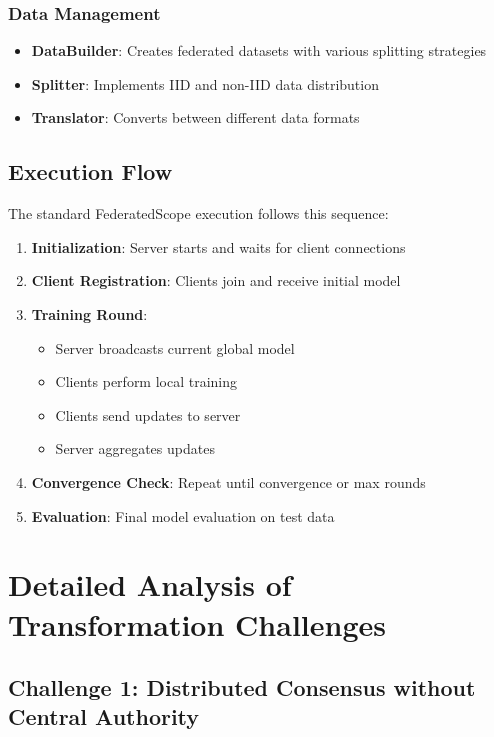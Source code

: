 \documentclass[11pt,conference]{article}
\begin{document}
\subsubsection{Data Management}
\begin{itemize}
    \item \textbf{DataBuilder}: Creates federated datasets with various splitting strategies
    \item \textbf{Splitter}: Implements IID and non-IID data distribution
    \item \textbf{Translator}: Converts between different data formats
\end{itemize}

\subsection{Execution Flow}

The standard FederatedScope execution follows this sequence:

\begin{enumerate}
    \item \textbf{Initialization}: Server starts and waits for client connections
    \item \textbf{Client Registration}: Clients join and receive initial model
    \item \textbf{Training Round}:
        \begin{itemize}
            \item Server broadcasts current global model
            \item Clients perform local training
            \item Clients send updates to server
            \item Server aggregates updates
        \end{itemize}
    \item \textbf{Convergence Check}: Repeat until convergence or max rounds
    \item \textbf{Evaluation}: Final model evaluation on test data
\end{enumerate}

\section{Detailed Analysis of Transformation Challenges}

\subsection{Challenge 1: Distributed Consensus without Central Authority}
\end{document}
